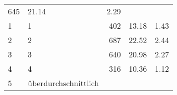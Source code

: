 \begin{longtable}{lXrrr}
       \num{645} &
       \num[round-mode=places,round-precision=2]{21,14} &
         \num[round-mode=places,round-precision=2]{2,29} \\

     1 &
     \multicolumn{1}{X}{ 1   } &


       \num{402} &
       \num[round-mode=places,round-precision=2]{13,18} &
         \num[round-mode=places,round-precision=2]{1,43} \\

     2 &
     \multicolumn{1}{X}{ 2   } &


       \num{687} &
       \num[round-mode=places,round-precision=2]{22,52} &
         \num[round-mode=places,round-precision=2]{2,44} \\

     3 &
     \multicolumn{1}{X}{ 3   } &


       \num{640} &
       \num[round-mode=places,round-precision=2]{20,98} &
         \num[round-mode=places,round-precision=2]{2,27} \\

     4 &
     \multicolumn{1}{X}{ 4   } &


       \num{316} &
       \num[round-mode=places,round-precision=2]{10,36} &
         \num[round-mode=places,round-precision=2]{1,12} \\

     5 &
     \multicolumn{1}{X}{ überdurchschnittlich   } &



\end{longtable}
